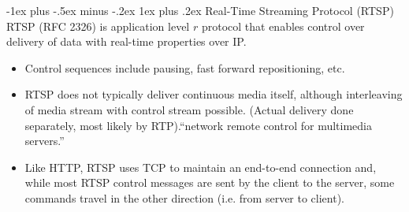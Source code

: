 \documentclass[12pt, landscape]{article}
\makeatletter
\renewcommand{\subsubsection}{\@startsection{subsubsection}{3}{0.1mm}%
                                {-1ex plus -.5ex minus -.2ex}%
                                {1ex plus .2ex}%
                                {\normalfont\small\bfseries}}
\makeatother
\begin{document}
\begin{multicols*}{3}
\subsubsection{Real-Time Streaming Protocol (RTSP)}
RTSP (RFC 2326) is application level $r$ protocol that enables control over delivery of data with real-time properties over IP.
\begin{itemize}
\item Control sequences include pausing, fast forward repositioning, etc.
\item RTSP does not typically deliver continuous media itself, although interleaving of media stream with control stream possible. (Actual delivery done separately, most likely by RTP).``network remote control for multimedia servers.''
\item Like HTTP, RTSP uses TCP to maintain an end-to-end connection and, while most RTSP control messages are
sent by the client to the server, some commands travel in the other direction (i.e. from server to client).
\end{itemize}

\vfill \null
\columnbreak


\end{multicols*}
\end{document}
